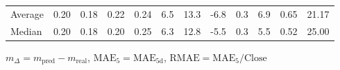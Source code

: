 \begin{threeparttable}
{\begin{tabular}{lrrrrrrrrrrr}
Average &          0.20 &          0.18 &          0.22 &        0.24 &                 6.5 &                13.3 &       -6.8 &                 0.3 &              6.9 &            0.65 &                  21.17 \\
 Median &          0.20 &          0.18 &          0.20 &        0.25 &                 6.3 &                12.8 &       -5.5 &                 0.3 &              5.5 &            0.52 &                  25.00 \\
\bottomrule
\end{tabular}
}
\begin{tablenotes}\footnotesize
\item $m_\Delta=m_{\text{pred}}-m_{\text{real}}$,
$\mathrm{MAE}_5=\mathrm{MAE}_{5\text{d}}$,
$\mathrm{RMAE}=\mathrm{MAE}_5/\text{Close}$
\end{tablenotes}
\end{threeparttable}
\endgroup

